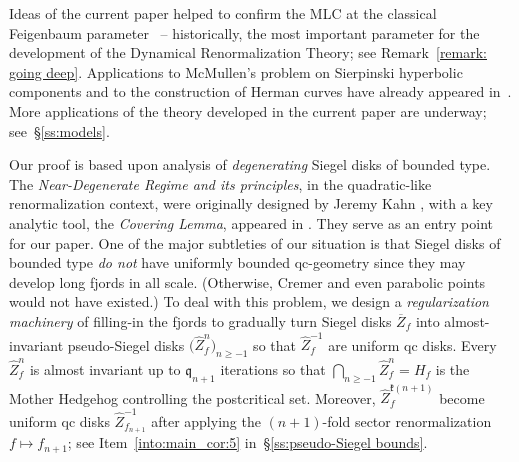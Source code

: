 \documentclass{amsart}
\newcommand{\1}{{\mathbb 1 }}
\newcommand{\wZ}{{\widehat Z}}
\newcommand{\qq}{\mathfrak{q}}
\newcommand{\kk}{\mathfrak{k}}
\theoremstyle{remark}
\numberwithin{equation}{section}
\theoremstyle{definition}
\begin{document}



Ideas of the current paper helped to confirm the MLC at the classical Feigenbaum parameter~\cite{DL:Feigen} -- historically, the most important parameter for the development of the Dynamical Renormalization Theory;  see Remark~\ref{remark: going deep}.  Applications to McMullen's problem on Sierpinski hyperbolic components and to the construction of Herman curves have already appeared in~\cite{DL:HypComp,Lim}. More applications of the theory developed in the current paper are underway; see~\S\ref{ss:models}.




Our proof is based upon analysis of {\em degenerating} Siegel disks of bounded type. The {\em Near-Degenerate Regime and its principles}, in the quadratic-like renormalization context,
were originally designed by Jeremy Kahn \cite{K},
with a key analytic tool, the {\em Covering Lemma}, 
 appeared in \cite{KL}. They serve as an entry point for our paper. One of the major subtleties of our situation is that Siegel disks of bounded type \emph{do not} have uniformly bounded qc-geometry since they may develop long fjords in all scale. (Otherwise, Cremer and even parabolic points would not have existed.) To deal with this problem, we design a \emph{regularization machinery} of filling-in the fjords to gradually turn Siegel disks $\overline Z_f$ into almost-invariant pseudo-Siegel disks $\big(\wZ_f^n\big)_{n\ge -1}$ so that $\wZ_f^{-1}$ are uniform qc disks. Every $\wZ_f^n$ is almost invariant up to $\qq_{n+1}$ iterations so that $\bigcap_{n\ge -1} \wZ^n_f=H_f$ is the Mother Hedgehog controlling the postcritical set. Moreover, $\wZ^{\kk(n+1)}_f$ become uniform qc disks $\wZ^{-1}_{f_{n+1}}$ after applying the $(n+1)$-fold sector renormalization $f\mapsto f_{n+1}$; see Item~\ref{into:main_cor:5} in~\S\ref{ss:pseudo-Siegel bounds}.
 
\end{document}
